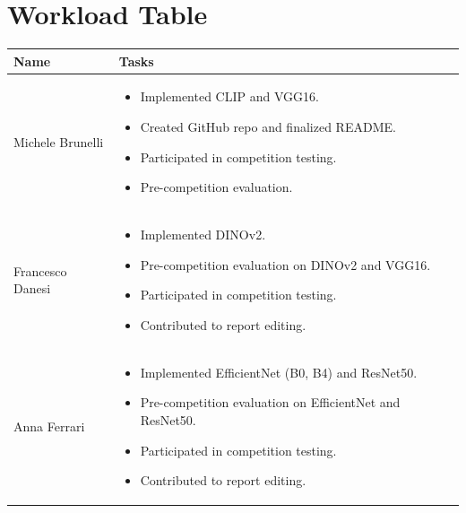 \section{Workload Table}

\begin{table}[H]
\centering
\footnotesize
\setlength{\tabcolsep}{4pt}
\begin{tabular}{@{} l >{\raggedright\arraybackslash}p{} @{}}
\toprule
\textbf{Name} & \textbf{Tasks} \\
\midrule
Michele Brunelli &
\parbox[t]{0.78\columnwidth}{
\begin{itemize}
  \item Implemented CLIP and VGG16.
  \item Created GitHub repo and finalized README.
  \item Participated in competition testing.
  \item Pre-competition evaluation.
\end{itemize}
} \\
Francesco Danesi &
\parbox[t]{0.78\columnwidth}{
\begin{itemize}
  \item Implemented DINOv2.
  \item Pre-competition evaluation on DINOv2 and VGG16.
  \item Participated in competition testing.
  \item Contributed to report editing.
\end{itemize}
} \\
Anna Ferrari &
\parbox[t]{0.78\columnwidth}{
\begin{itemize}
  \item Implemented EfficientNet (B0, B4) and ResNet50.
  \item Pre-competition evaluation on EfficientNet and ResNet50.
  \item Participated in competition testing.
  \item Contributed to report editing.
\end{itemize}
} \\
\end{tabular}
\end{table}